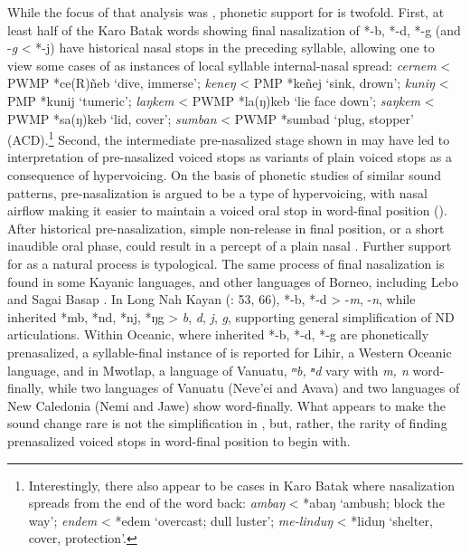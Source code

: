\documentclass[output=paper]{langscibook}
\begin{document}
While the focus of that analysis was , phonetic support for  is twofold. First, at least half of the Karo Batak words showing final nasalization of *-b, *-d, *-g (and -\textit{g} < *-j) have historical nasal stops in the preceding syllable, allowing one to view some cases of  as instances of local syllable internal-nasal spread: \textit{cernem} < PWMP *ce(R)ñeb ‘dive, immerse’; \textit{keneŋ} < PMP *keñej ‘sink, drown’; \textit{kuniŋ} < PMP *kunij ‘tumeric’; \textit{laŋkem} < PWMP *la(ŋ)keb ‘lie face down’; \textit{saŋkem} < PWMP *sa(ŋ)keb ‘lid, cover’; \textit{sumban} < PWMP *sumbad ‘plug, stopper’ (ACD).\footnote{Interestingly, there also appear to be cases in Karo Batak where nasalization spreads from the end of the word back: \textit{ambaŋ} < *abaŋ ‘ambush; block the way’; \textit{endem} < *edem ‘overcast; dull luster’;  \textit{me-linduŋ} < *liduŋ ‘shelter, cover, protection’.} Second, the intermediate pre-nasalized stage shown in  may have led to interpretation of pre-nasalized voiced stops as variants of plain voiced stops as a consequence of hypervoicing. On the basis of phonetic studies of similar sound patterns, pre-nasalization is argued to be a type of hypervoicing, with nasal airflow making it easier to maintain a voiced oral stop in word-final position (\citealt{IversonSalmons1996, WetzelsNevins2018}). After historical pre-nasalization, simple non-release in final position, or a short inaudible oral phase, could result in a percept of a plain nasal . Further support for  as a natural process is typological. The same process of final nasalization is found in some Kayanic languages, and other languages of Borneo, including Lebo and Sagai Basap \citep[201]{Smith2017}. In Long Nah Kayan (\citealt{Smith2017}: 53, 66), *-b, *-d > -\textit{m}, -\textit{n}, while inherited *mb, *nd, *nj, *ŋg > \textit{b}, \textit{d}, \textit{j}, \textit{g}, supporting general simplification of ND articulations. Within Oceanic, where inherited *-b, *-d, *-g are phonetically prenasalized, a syllable-final instance of  is reported for Lihir, a Western Oceanic language, and in Mwotlap, a language of Vanuatu, \textit{ᵐ}\textit{b, ⁿ}\textit{d} vary with \textit{m, n} word-finally, while two languages of Vanuatu (Neve’ei and Avava) and two languages of New Caledonia (Nemi and Jawe) show  word-finally. What appears to make the sound change rare is not the simplification in , but, rather, the rarity of finding prenasalized voiced stops in word-final position to begin with.
\end{document}
